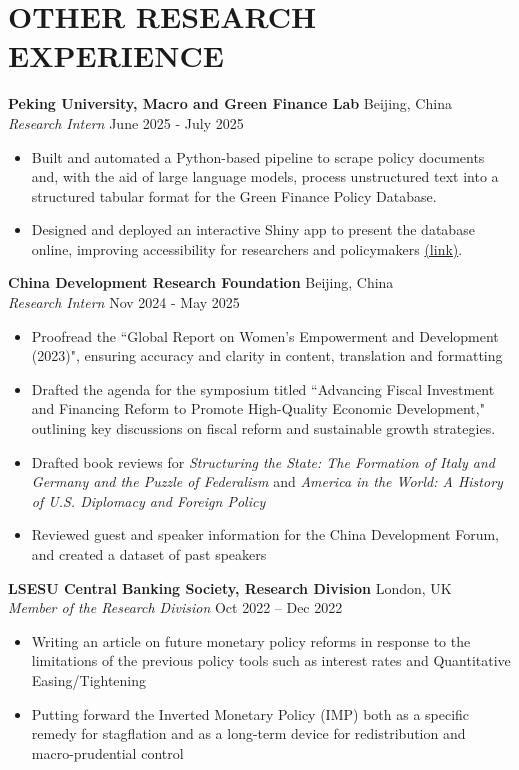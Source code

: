 \documentclass[a4paper,9pt]{extarticle}
\begin{document}
\section*{OTHER RESEARCH EXPERIENCE}
\noindent
\textbf{Peking University, Macro and Green Finance Lab} \hfill Beijing, China \\
\textit{Research Intern} \hfill June 2025 - July 2025
\begin{itemize}
    \item Built and automated a Python-based pipeline to scrape policy documents and, with the aid of large language models, process unstructured text into a structured tabular format for the Green Finance Policy Database.
    \item Designed and deployed an interactive Shiny app to present the database online, improving accessibility for researchers and policymakers \href{https://mgflab.nsd.pku.edu.cn/MGFsjk/zczz/index.htm}{(link)}.
\end{itemize}
\noindent
\textbf{China Development Research Foundation} \hfill Beijing, China \\
\textit{Research Intern} \hfill Nov 2024 - May 2025
\begin{itemize}
    \item Proofread the ``Global Report on Women's Empowerment and Development (2023)", ensuring accuracy and clarity in content, translation and formatting
    \item Drafted the agenda for the symposium titled ``Advancing Fiscal Investment and Financing Reform to Promote High-Quality Economic Development," outlining key discussions on fiscal reform and sustainable growth strategies.
    \item Drafted book reviews for \textit{Structuring the State: The Formation of Italy and Germany and the Puzzle of Federalism} and \textit{America in the World: A History of U.S. Diplomacy and Foreign Policy}
    \item Reviewed guest and speaker information for the China Development Forum, and created a dataset of past speakers
\end{itemize}
\noindent
\textbf{LSESU Central Banking Society, Research Division} \hfill London, UK\\ %
\textit{Member of the Research Division} \hfill Oct 2022 – Dec 2022 %
\begin{itemize}
    \item Writing an article on future monetary policy reforms in response to the limitations of the previous policy tools such as interest rates and Quantitative Easing/Tightening
    \item Putting forward the Inverted Monetary Policy (IMP) both as a specific remedy for stagflation and as a long-term device  for redistribution and macro-prudential control
\end{itemize}
\end{document}
